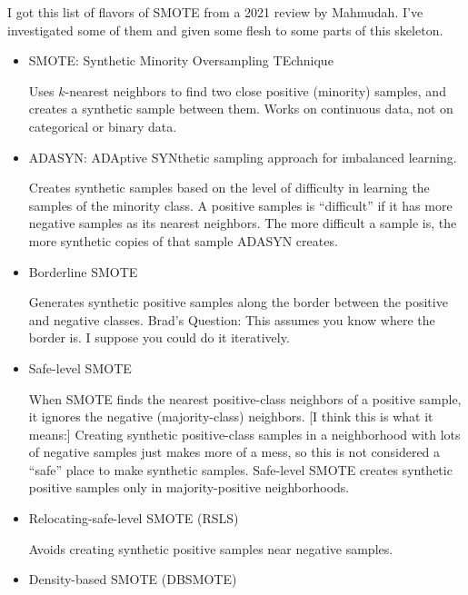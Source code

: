  I got this list of flavors of SMOTE from a 2021 review by Mahmudah.
			\cite{MAHMUDAH_2021}  I've investigated some of them and given some flesh to some parts of this skeleton.
 
 		\begin{itemize}
			\item SMOTE:  Synthetic Minority Oversampling TEchnique 
			\cite{CHAWLA_2002}
			
			Uses $k$-nearest neighbors to find two close positive (minority) samples, and creates a synthetic sample between them.  Works on continuous data, not on categorical or binary data.  
			
			\item ADASYN:  ADAptive SYNthetic sampling approach for imbalanced learning.  
			\cite{MAHMUDAH_2021}
			
			Creates synthetic samples based on the level of difficulty in learning the samples of the minority class.  A positive samples is ``difficult'' if it has more negative samples as its nearest neighbors.  The more difficult a sample is, the more synthetic copies of that sample ADASYN creates.  
			
			\item Borderline SMOTE
			\cite{MAHMUDAH_2021}
			
			Generates synthetic positive samples along the border between the positive and negative classes.  Brad's Question:  This assumes you know where the border is.  I suppose you could do it iteratively.  
			
			\item Safe-level SMOTE
			\cite{MAHMUDAH_2021}

			When SMOTE finds the nearest positive-class neighbors of a positive sample, it ignores the negative (majority-class) neighbors.  [I think this is what it means:]  Creating synthetic positive-class samples in a neighborhood with lots of negative samples just makes more of a mess, so this is not considered a ``safe'' place to make synthetic samples.  Safe-level SMOTE creates synthetic positive samples only in majority-positive neighborhoods.  
			
			\item Relocating-safe-level SMOTE (RSLS)
			\cite{MAHMUDAH_2021}
			
			Avoids creating synthetic positive samples near negative samples.  
			
			\item Density-based SMOTE (DBSMOTE)
			\cite{MAHMUDAH_2021}


\end{itemize}
